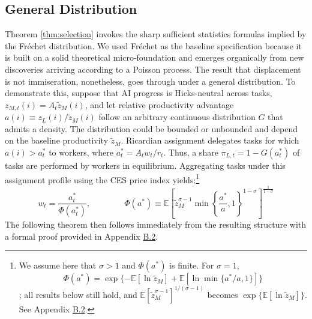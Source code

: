 \documentclass[11pt]{article}
\begin{document}
\subsection{General Distribution}

Theorem \ref{thm:selection} invokes the sharp sufficient statistics
formulas implied by the Fréchet distribution. We used Fréchet as the
baseline specification because it is built on a solid theoretical
micro-foundation and emerges organically from new discoveries arriving
according to a Poisson process. The result that displacement is not
immiseration, nonetheless, goes through under a general distribution.
To demonstrate this, suppose that AI progress is Hicks-neutral across
tasks, $z_{M,t}(i)=A_{t}\tilde{z}_{M}(i)$, and let relative productivity
advantage $a(i)\equiv z_{L}(i)/\tilde{z}_{M}(i)$ follow an arbitrary
continuous distribution $G$ that admits a density. The distribution
could be bounded or unbounded and depend on the baseline productivity
$\tilde{z}_{M}$. Ricardian assignment delegates tasks for which $a(i)>a^{*}_{t}$
to workers, where $a^{*}_{t}=A_{t}w_{t}/r_{t}$. Thus, a share $\pi_{L,t}=1-G(a^{*}_{t})$
of tasks are performed by workers in equilibrium. Aggregating tasks
under this assignment profile using the CES price index yields:\footnote{We assume here that $\sigma>1$ and $\Phi(a^{*})$ is finite. For
$\sigma=1$, \[\Phi(a^{*})=\exp\{-\mathbb{E}[\ln\tilde{z}_{M}]+\mathbb{E}[\ln\min\{a^{*}/a,1\}]\}\];
all results below still hold, and $\mathbb{E}[\tilde{z}^{\sigma-1}_{M}]^{1/(\sigma-1)}$
becomes $\exp\{\mathbb{E}[\ln\tilde{z}_{M}]\}$. See Appendix \href{https://ahmadlp.github.io/Lashkaripour_AI_Displacement_Online_Appendix.pdf\#page=15}{B.2}.}
\[
w_{t}=\frac{a^{*}_{t}}{\Phi(a^{*}_{t})},\qquad\qquad\Phi(a^{*})\equiv\mathbb{E}\!\left[\tilde{z}^{\sigma-1}_{M}\min\!\left\{ \frac{a^{*}}{a},1\right\} ^{1-\sigma}\right]^{\frac{1}{1-\sigma}}
\]
The following theorem then follows immediately from the resulting
structure with a formal proof provided in Appendix \href{https://ahmadlp.github.io/Lashkaripour_AI_Displacement_Online_Appendix.pdf\#page=15}{B.2}.

\addtocounter{theorem}{-1}
\renewcommand{\thetheorem}{\arabic{theorem}.b}
\def\theHtheorem{\arabic{theorem}.b}
\end{document}
